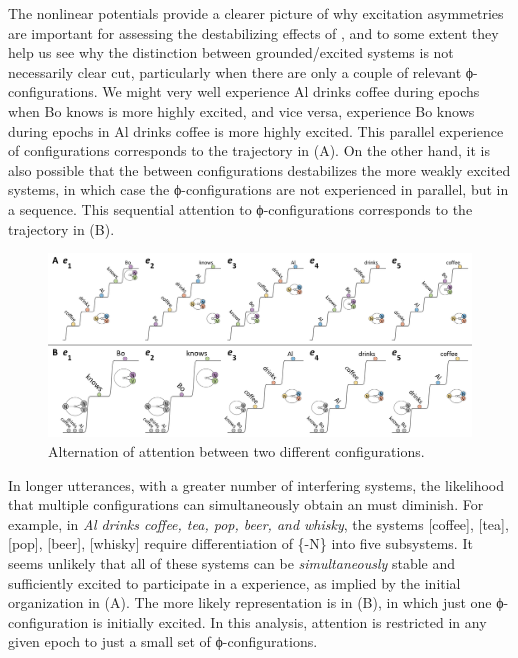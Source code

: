   The nonlinear potentials provide a clearer picture of why excitation asymmetries are important for assessing the destabilizing effects of , and to some extent they help us see why the distinction between grounded/excited systems is not necessarily clear cut, particularly when there are only a couple of relevant ϕ-configurations. We might very well experience {\textbar}Al drinks coffee{\textbar} during epochs when {\textbar}Bo knows{\textbar} is more highly excited, and vice versa, experience {\textbar}Bo knows{\textbar} during epochs in {\textbar}Al drinks coffee{\textbar} is more highly excited. This parallel experience of configurations corresponds to the trajectory in {}(A). On the other hand, it is also possible that the  between configurations destabilizes the more weakly excited systems, in which case the ϕ-configurations are not experienced in parallel, but in a sequence. This sequential attention to ϕ-configurations corresponds to the trajectory in {}(B).

  
\begin{figure}
\includegraphics[width=\textwidth]{figures/Tilsen-img97.png}
\caption{Alternation of attention between two different configurations.}
\label{fig:4:47}
\end{figure}
 

  In longer utterances, with a greater number of interfering systems, the likelihood that multiple configurations can simultaneously obtain an  must diminish. For example, in \textit{Al drinks coffee, tea, pop, beer, and whisky}, the systems [coffee], [tea], [pop], [beer], [whisky] require differentiation of \{-N\} into five subsystems. It seems unlikely that all of these systems can be \textit{simultaneously} stable and sufficiently excited to participate in a  experience, as implied by the initial organization in {}(A). The more likely representation is in (B), in which just one ϕ-configuration is initially excited. In this analysis, attention is restricted in any given epoch to just a small set of ϕ-configurations.

